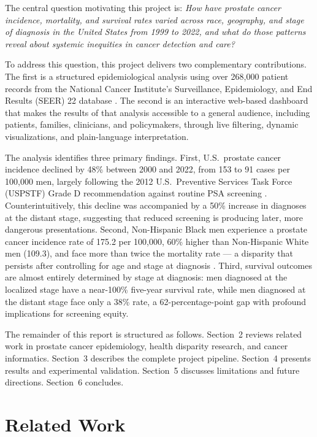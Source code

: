 The central question motivating this project is: \textit{How have prostate cancer
incidence, mortality, and survival rates varied across race, geography, and stage of
diagnosis in the United States from 1999 to 2022, and what do those patterns reveal
about systemic inequities in cancer detection and care?}

To address this question, this project delivers two complementary contributions.
The first is a structured epidemiological analysis using over 268,000 patient records
from the National Cancer Institute's Surveillance, Epidemiology, and End Results
(SEER) 22 database \cite{seer2024}. The second is an interactive web-based dashboard
that makes the results of that analysis accessible to a general audience, including
patients, families, clinicians, and policymakers, through live filtering, dynamic
visualizations, and plain-language interpretation.

The analysis identifies three primary findings. First, U.S.\ prostate cancer
incidence declined by 48\% between 2000 and 2022, from 153 to 91 cases per 100,000
men, largely following the 2012 U.S.\ Preventive Services Task Force (USPSTF) Grade D
recommendation against routine PSA screening \cite{uspstf2012}. Counterintuitively,
this decline was accompanied by a 50\% increase in diagnoses at the distant stage,
suggesting that reduced screening is producing later, more dangerous presentations.
Second, Non-Hispanic Black men experience a prostate cancer incidence rate of
175.2 per 100,000, 60\% higher than Non-Hispanic White men (109.3), and face
more than twice the mortality rate --- a disparity that persists after controlling
for age and stage at diagnosis \cite{desantis2019}. Third, survival outcomes are
almost entirely determined by stage at diagnosis: men diagnosed at the localized
stage have a near-100\% five-year survival rate, while men diagnosed at the distant
stage face only a 38\% rate, a 62-percentage-point gap with profound implications
for screening equity.

The remainder of this report is structured as follows. Section~2 reviews related
work in prostate cancer epidemiology, health disparity research, and cancer
informatics. Section~3 describes the complete project pipeline. Section~4 presents
results and experimental validation. Section~5 discusses limitations and future
directions. Section~6 concludes.

\section{Related Work}

